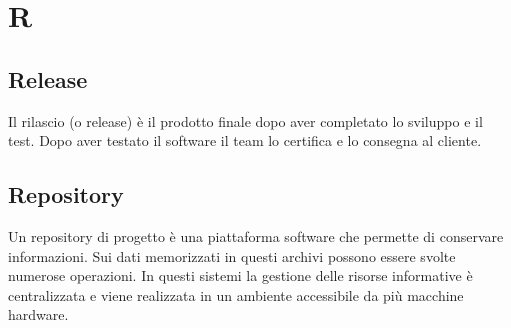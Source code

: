 \section{R}
 \subsection{Release}%
 Il rilascio (o release) è il prodotto finale dopo aver completato lo sviluppo e il test. Dopo aver testato il software il team lo certifica e lo consegna al cliente.
 
 \subsection{Repository}%
 Un repository di progetto è una piattaforma software che permette di conservare informazioni. Sui dati memorizzati in questi archivi possono essere svolte numerose operazioni. In questi sistemi la gestione delle risorse informative è centralizzata e viene realizzata in un ambiente accessibile da più macchine hardware.
 
\clearpage